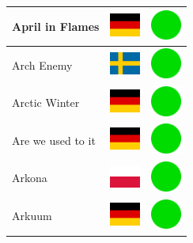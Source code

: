 \documentclass[12pt, a4paper, twoside]{report}
\begin{document}
\begin{center}
\begin{longtable}{|p{5cm}|p{2cm}|p{2cm}|}
 April in Flames                                            & \includegraphics[width=1cm]{../4x3/de} &   \includegraphics[width=1cm]{../likes/y} \\ \hline
 Arch Enemy                                                 & \includegraphics[width=1cm]{../4x3/se} &   \includegraphics[width=1cm]{../likes/y} \\ \hline
 Arctic Winter                                              & \includegraphics[width=1cm]{../4x3/de} &   \includegraphics[width=1cm]{../likes/y} \\ \hline
 Are we used to it                                          & \includegraphics[width=1cm]{../4x3/de} &   \includegraphics[width=1cm]{../likes/y} \\ \hline
 Arkona                                                     & \includegraphics[width=1cm]{../4x3/pl} &   \includegraphics[width=1cm]{../likes/y} \\ \hline
 Arkuum                                                     & \includegraphics[width=1cm]{../4x3/de} &   \includegraphics[width=1cm]{../likes/y} \\ \hline

\end{longtable}
\end{center}
\end{document}
